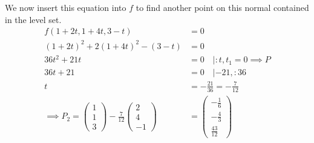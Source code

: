 \documentclass[a4paper,fontsize = 10pt]{article}
\begin{document}
We now insert this equation into $f$ to find another point on this normal contained in the level set.
\begin{align*}
  f(1 +2t, 1+ 4t, 3 - t) &= 0 \\
  (1 +2t)^2 + 2(1+4t)^2 - (3-t) &= 0\\
  36 t^2 + 21t &= 0 \quad |:t, t_1 = 0 \implies P\\
  36t + 21 &= 0 \quad |-21, : 36\\
  t &= -\frac{21}{36} = -\frac{7}{12}\\
  \implies P_2 = \begin{pmatrix}
    1\\ 1 \\ 3
  \end{pmatrix} - \frac{7}{12}
  \begin{pmatrix}
    2\\ 4\\ -1
  \end{pmatrix} 
  &= \begin{pmatrix}
    -\frac{1}{6}\\ -\frac{4}{3}\\ \frac{43}{12}
  \end{pmatrix}
\end{align*}
\end{document}
